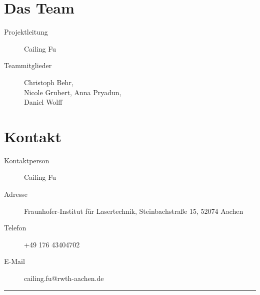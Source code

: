 \documentclass[a4paper,12pt,notumble]{leaflet}
\begin{document}
\noindent
\begin{minipage}[c][0.45\textheight][t]{\textwidth}
	\section{Das Team}
	\begin{description}
		\item[Projektleitung] Cailing Fu
		\item[Teammitglieder] Christoph Behr, \\ Nicole Grubert, Anna Pryadun, \\ Daniel Wolff
	\end{description}

	\section{Kontakt}
	\begin{description}
		\item[Kontaktperson] Cailing Fu 
		\item[Adresse] Fraunhofer-Institut für Lasertechnik, Steinbachstraße 15, 52074 Aachen
		\item[Telefon] +49 176 43404702
		\item[E-Mail] cailing.fu@rwth-aachen.de
	\end{description}
\end{minipage}

\textcolor{rwth-lblue}{\noindent\rule{\textwidth}{4pt}}
\end{document}
